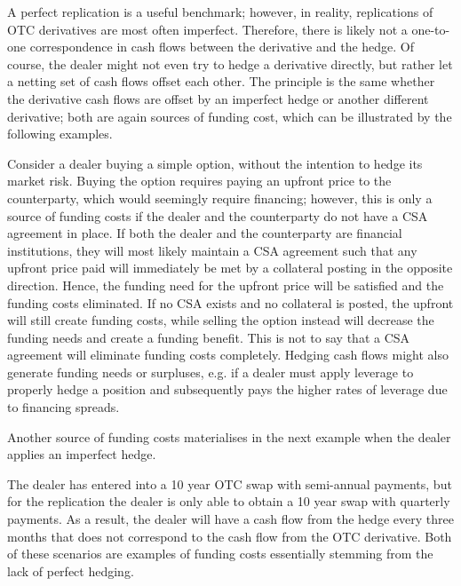 \documentclass[main.tex]{subfiles}
\begin{document}
        A perfect replication is a useful benchmark;
        however, in reality, replications of OTC derivatives are most often imperfect.
        Therefore, there is likely not a one-to-one correspondence 
        in cash flows between the derivative and the hedge.
        Of course, the dealer might not even try to hedge a derivative directly,
        but rather let a netting set of cash flows offset each other. 
        The principle is the same whether the derivative cash flows are offset by an imperfect hedge
        or another different derivative;
        both are again sources of funding cost, which can be illustrated by the following examples.

        \begin{example}
        Consider a dealer buying a simple option, without the intention to hedge its market risk.
        Buying the option requires paying an upfront price to the counterparty,
        which would seemingly require financing;
        however, this is only a source of funding costs 
        if the dealer and the counterparty do not have a CSA agreement in place.
        If both the dealer and the counterparty are financial institutions, 
        they will most likely maintain a CSA agreement
        such that any upfront price paid will immediately be met by a collateral posting in the opposite direction.
        Hence, the funding need for the upfront price will be satisfied and the funding costs eliminated.
        If no CSA exists and no collateral is posted, the upfront will still create funding costs,
        while selling the option instead will decrease the funding needs and create a funding benefit.
        This is not to say that a CSA agreement will eliminate funding costs completely. 
        Hedging cash flows might also generate funding needs or surpluses, 
        e.g. if a dealer must apply leverage to properly hedge a position 
        and subsequently pays the higher rates of leverage due to financing spreads.
        \end{example}

        Another source of funding costs materialises in the next example when the dealer applies an imperfect hedge.
        
        \begin{example}
        The dealer has entered into a 10 year OTC swap with semi-annual payments, 
        but for the replication the dealer is only able to obtain a 10 year swap with quarterly payments.
        As a result, the dealer will have a cash flow from the hedge every three months
        that does not correspond to the cash flow from the OTC derivative. 
        Both of these scenarios are examples of funding costs essentially stemming from the lack of perfect hedging.
        \end{example}
\end{document}
